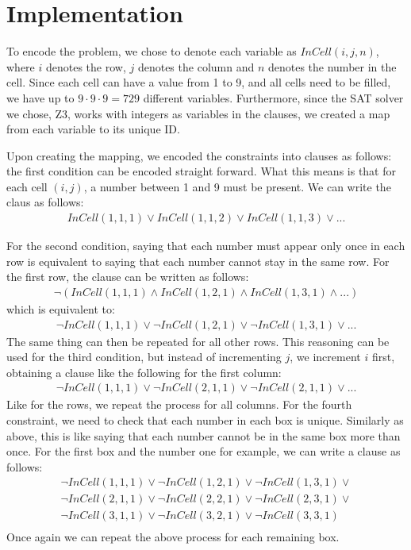 \documentclass[12pt,a4paper]{article}
\begin{document}
\section*{Implementation}
To encode the problem, we chose to denote each variable as $InCell(i,j,n)$, where $i$ denotes the row, $j$ denotes the column and $n$ denotes the number in the cell.
Since each cell can have a value from 1 to 9, and all cells need to be filled, we have up to $9\cdot9\cdot9 = 729$ different variables.
Furthermore, since the SAT solver we chose, Z3, works with integers as variables in the clauses, we created a map from each variable to its unique ID.

Upon creating the mapping, we encoded the constraints into clauses as follows: the first condition can be encoded straight forward. What this means is that for each cell $(i,j)$, a number between 1 and 9 must be present. We can write the claus as follows:
\begin{align*}
  InCell(1,1,1) \vee InCell(1,1,2) \vee InCell(1,1,3) \vee ...
\end{align*}

For the second condition, saying that each number must appear only once in each row is equivalent to saying that each number cannot stay in the same row. For the first row, the clause can be written as follows:
\begin{align*}
  \neg(InCell(1,1,1) \wedge InCell(1,2,1) \wedge InCell(1,3,1) \wedge ...)
\end{align*}
which is equivalent to:
\begin{align*}
  \neg InCell(1,1,1) \vee \neg InCell(1,2,1) \vee \neg InCell(1,3,1) \vee ...
\end{align*}
The same thing can then be repeated for all other rows.
\medskip
This reasoning can be used for the third condition, but instead of incrementing $j$, we increment $i$ first, obtaining a clause like the following for the first column:
\begin{align*}
  \neg InCell(1,1,1) \vee \neg InCell(2,1,1) \vee \neg InCell(2,1,1) \vee ...
\end{align*}
Like for the rows, we repeat the process for all columns.
\medskip
For the fourth constraint, we need to check that each number in each box is unique. Similarly as above, this is like saying that each number cannot be in the same box more than once. For the first box and the number one for example, we can write a clause as follows:
\begin{align*}
  \neg InCell(1,1,1) \vee \neg InCell(1,2,1) \vee \neg InCell(1,3,1) \vee \\
  \neg InCell(2,1,1) \vee \neg InCell(2,2,1) \vee \neg InCell(2,3,1) \vee \\
  \neg InCell(3,1,1) \vee \neg InCell(3,2,1) \vee \neg InCell(3,3,1) \\
\end{align*}
Once again we can repeat the above process for each remaining box.
\medskip
\end{document}
